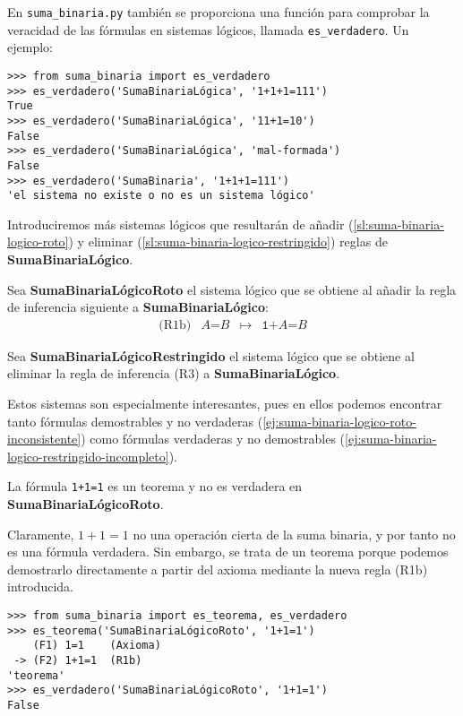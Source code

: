En \texttt{suma\_binaria.py} también se proporciona una función para comprobar la veracidad de las fórmulas en sistemas lógicos, llamada \texttt{es\_verdadero}. Un ejemplo:
\begin{lstlisting}[numbers=none,frame=none]
>>> from suma_binaria import es_verdadero
>>> es_verdadero('SumaBinariaLógica', '1+1+1=111')
True
>>> es_verdadero('SumaBinariaLógica', '11+1=10')
False
>>> es_verdadero('SumaBinariaLógica', 'mal-formada')
False
>>> es_verdadero('SumaBinaria', '1+1+1=111')
'el sistema no existe o no es un sistema lógico'
\end{lstlisting}
Introduciremos más sistemas lógicos que resultarán de añadir (\cref{sl:suma-binaria-logico-roto}) y eliminar (\cref{sl:suma-binaria-logico-restringido}) reglas de \textbf{SumaBinariaLógico}.

\begin{sistemalogico}\label{sl:suma-binaria-logico-roto}
Sea \textbf{SumaBinariaLógicoRoto} el sistema lógico que se obtiene al añadir la regla de inferencia siguiente a \textbf{SumaBinariaLógico}:
$$
    \begin{matrix}
    \text{(R1b)} & A\texttt{=}B & \mapsto & \texttt{1+}A\texttt{=}B
    \end{matrix}
    $$
\end{sistemalogico}


\begin{sistemalogico}\label{sl:suma-binaria-logico-restringido}
Sea \textbf{SumaBinariaLógicoRestringido} el sistema lógico que se obtiene al eliminar la regla de inferencia (R3) a \textbf{SumaBinariaLógico}.
\end{sistemalogico}
Estos sistemas son especialmente interesantes, pues en ellos podemos encontrar tanto fórmulas demostrables y no verdaderas (\cref{ej:suma-binaria-logico-roto-inconsistente}) como fórmulas verdaderas y no demostrables (\cref{ej:suma-binaria-logico-restringido-incompleto}).

\begin{ejemplo}\label{ej:suma-binaria-logico-roto-inconsistente}
La fórmula \texttt{1+1=1} es un teorema y no es verdadera en \textbf{SumaBinariaLógicoRoto}.

Claramente, $1+1=1$ no una operación cierta de la suma binaria, y por tanto no es una fórmula verdadera. Sin embargo, se trata de un teorema porque podemos demostrarlo directamente a partir del axioma mediante la nueva regla (R1b) introducida.
\begin{lstlisting}[numbers=none,frame=none]
>>> from suma_binaria import es_teorema, es_verdadero
>>> es_teorema('SumaBinariaLógicoRoto', '1+1=1')
    (F1) 1=1    (Axioma)
 -> (F2) 1+1=1  (R1b)
'teorema'
>>> es_verdadero('SumaBinariaLógicoRoto', '1+1=1')
False
\end{lstlisting}
\end{ejemplo}

